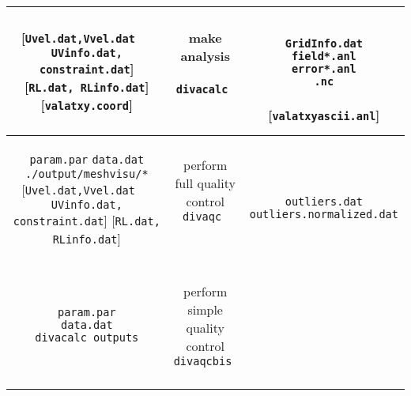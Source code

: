 \documentclass[8pt,a4paper,notitlepage]{book}
\begin{document}
\begin{table}
\begin{center}
{{\begin{tabular}{c|c|c}
{ {[{\tt Uvel.dat,Vvel.dat}} \\
 { $\quad ${\tt UVinfo.dat, constraint.dat}]} \\
 {[{\tt RL.dat, RLinfo.dat}]} \\
 {[{\tt valatxy.coord}] }
}
 & 
\shortstack{
{  { }  } \\
{\sf make analysis} \\
{  { }  } \\
{\tt divacalc    } 
\\
{  { }  } \\
{  { }  } \\
{  { }  }
}
& 
\shortstack{
{  { }  } \\
{\tt GridInfo.dat} \\
{\tt field*.anl} \\
{\tt error*.anl} \\
{\tt *.nc} \\
{  { }  } \\
{[{\tt valatxyascii.anl}]}
} 
\\ \hline
 \shortstack{
 {  { }  } \\
 {\tt param.par} \\
 {\tt data.dat} \\
 {\tt ./output/meshvisu/*} \\
 {[{\tt Uvel.dat,Vvel.dat}} \\
 { $\quad ${\tt UVinfo.dat, constraint.dat}]} \\
 {[{\tt RL.dat, RLinfo.dat}]} 
}
 & 
\shortstack{
{  { }  } \\
{\sf perform full quality control} \\
{\tt divaqc    } 
\\
{  { }  } \\
{  { }  } \\
{  { }  }
}
& 
\shortstack{
{  { }  } \\
{  { }  } \\
{{\tt outliers.dat}} \\
{{\tt outliers.normalized.dat}} \\
{  { }  } \\
{  { }  } 
} 
\\ \hline
 \shortstack{
 {\tt param.par} \\
 {\tt data.dat} \\
{\tt divacalc outputs}
}
 & 
\shortstack{
{  { }  } \\
{\sf perform simple quality control} \\
{\tt divaqcbis } 
\\
{  { }  } \\
}
\end{tabular}}}
\end{center}
\end{table}
\end{document}
